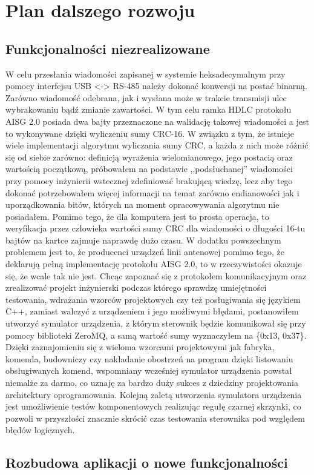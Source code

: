 \chapter{Plan dalszego rozwoju}
\section{Funkcjonalności niezrealizowane}
    W celu przesłania wiadomości zapisanej w systemie heksadecymalnym przy pomocy interfejsu USB <-> RS-485
    należy dokonać konwersji na postać binarną. Zarówno wiadomość odebrana, jak i wysłana może w trakcie transmisji ulec wybrakowaniu bądź
    zmianie zawartości. W tym celu ramka HDLC protokołu AISG 2.0 posiada dwa bajty przeznaczone na walidację takowej wiadomości a jest to wykonywane
    dzięki wyliczeniu sumy CRC-16. W związku z tym, że istnieje wiele implementacji algorytmu wyliczania sumy CRC, a każda z nich może różnić się od siebie zarówno:
    definicją wyrażenia wielomianowego, jego postacią oraz wartością początkową, próbowałem na podstawie ,,podsłuchanej'' wiadomości przy pomocy
    inżynierii wstecznej zdefiniować brakującą wiedzę, lecz aby tego dokonać potrzebowałem więcej informacji na temat zarówno endianowości
    jak i uporządkowania bitów, których na moment opracowywania algorytmu nie posiadałem. Pomimo tego, że dla komputera jest to prosta operacja, to weryfikacja przez człowieka
    wartości sumy CRC dla wiadomości o długości 16-tu bajtów na kartce zajmuje naprawdę dużo czasu. W dodatku powszechnym problemem jest to, że 
    producenci urządzeń linii antenowej pomimo tego, że deklarują pełną implementację protokołu AISG 2.0, to w rzeczywistości okazuje się, że
    wcale tak nie jest. Chcąc zapoznać się z protokołem komunikacyjnym oraz zrealizować projekt inżynierski podczas którego sprawdzę umiejętności testowania,
    wdrażania wzorców projektowych czy też posługiwania się językiem C++, zamiast walczyć z urządzeniem i jego możliwymi błędami, postanowiłem
    utworzyć symulator urządzenia, z którym sterownik będzie komunikował się przy pomocy biblioteki ZeroMQ, a samą wartość sumy wyznaczyłem na \{0x13, 0x37\}. 
    Dzięki zaznajomieniu się z wieloma wzorcami projektowymi jak fabryka, komenda, budowniczy czy nakładanie obostrzeń na program dzięki listowaniu obsługiwanych komend, 
    wspomniany wcześniej symulator urządzenia powstał niemalże za darmo, co uznaję za bardzo duży sukces z dziedziny projektowania architektury oprogramowania.
    Kolejną zaletą utworzenia symulatora urządzenia jest umożliwienie testów komponentowych realizując regułę czarnej skrzynki, co pozwoli w przyszłości
    znacznie skrócić czas testowania sterownika pod względem błędów logicznych.

\section{Rozbudowa aplikacji o nowe funkcjonalności}
